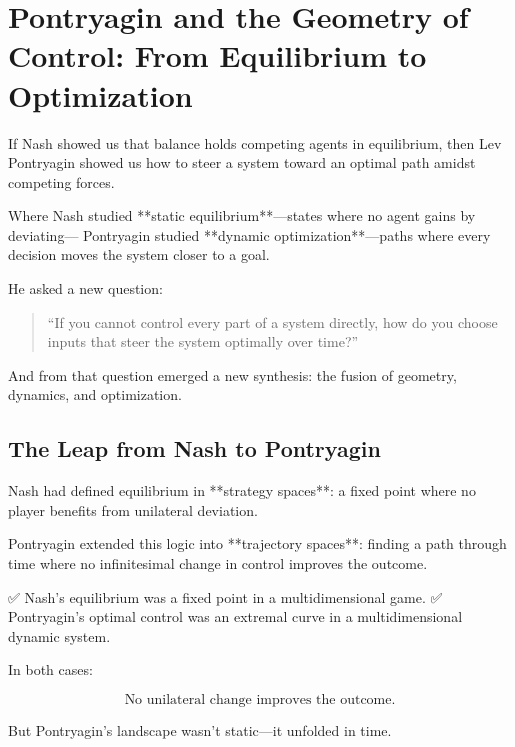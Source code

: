 \section{Pontryagin and the Geometry of Control: From Equilibrium to Optimization}

If Nash showed us that balance holds competing agents in equilibrium,  
then Lev Pontryagin showed us how to steer a system toward an optimal path amidst competing forces.

Where Nash studied **static equilibrium**—states where no agent gains by deviating—  
Pontryagin studied **dynamic optimization**—paths where every decision moves the system closer to a goal.

He asked a new question:

\begin{quote}
“If you cannot control every part of a system directly,  
how do you choose inputs that steer the system optimally over time?”
\end{quote}

And from that question emerged a new synthesis:  
the fusion of geometry, dynamics, and optimization.

\bigskip

\subsection*{The Leap from Nash to Pontryagin}

Nash had defined equilibrium in **strategy spaces**:  
a fixed point where no player benefits from unilateral deviation.

Pontryagin extended this logic into **trajectory spaces**:  
finding a path through time where no infinitesimal change in control improves the outcome.

✅ Nash’s equilibrium was a fixed point in a multidimensional game.  
✅ Pontryagin’s optimal control was an extremal curve in a multidimensional dynamic system.

In both cases:

\[
\boxed{\text{No unilateral change improves the outcome.}}
\]

But Pontryagin’s landscape wasn’t static—it unfolded in time.

\bigskip

